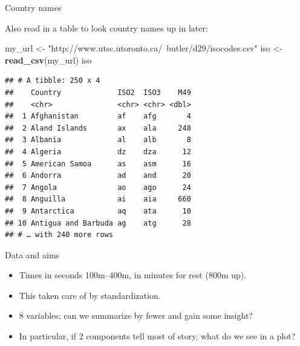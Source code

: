 \documentclass[ignorenonframetext,]{beamer}
\newenvironment{Shaded}{\begin{snugshade}}{\end{snugshade}}
\newcommand{\KeywordTok}[1]{\textcolor[rgb]{0.13,0.29,0.53}{\textbf{#1}}}
\newcommand{\NormalTok}[1]{#1}
\newcommand{\StringTok}[1]{\textcolor[rgb]{0.31,0.60,0.02}{#1}}
\begin{document}
\begin{frame}[fragile]{Country names}
\protect\hypertarget{country-names}{}

Also read in a table to look country names up in later:

\footnotesize

\begin{Shaded}
\begin{Highlighting}[]
\NormalTok{my_url <-}\StringTok{ "http://www.utsc.utoronto.ca/~butler/d29/isocodes.csv"}
\NormalTok{iso <-}\StringTok{ }\KeywordTok{read_csv}\NormalTok{(my_url)}
\NormalTok{iso}
\end{Highlighting}
\end{Shaded}

\begin{verbatim}
## # A tibble: 250 x 4
##    Country             ISO2  ISO3    M49
##    <chr>               <chr> <chr> <dbl>
##  1 Afghanistan         af    afg       4
##  2 Aland Islands       ax    ala     248
##  3 Albania             al    alb       8
##  4 Algeria             dz    dza      12
##  5 American Samoa      as    asm      16
##  6 Andorra             ad    and      20
##  7 Angola              ao    ago      24
##  8 Anguilla            ai    aia     660
##  9 Antarctica          aq    ata      10
## 10 Antigua and Barbuda ag    atg      28
## # … with 240 more rows
\end{verbatim}

\normalsize

\end{frame}

\begin{frame}{Data and aims}
\protect\hypertarget{data-and-aims}{}

\begin{itemize}
\item
  Times in seconds 100m--400m, in minutes for rest (800m up).
\item
  This taken care of by standardization.
\item
  8 variables; can we summarize by fewer and gain some insight?
\item
  In particular, if 2 components tell most of story, what do we see in a
  plot?
\end{itemize}

\end{frame}
\end{document}
